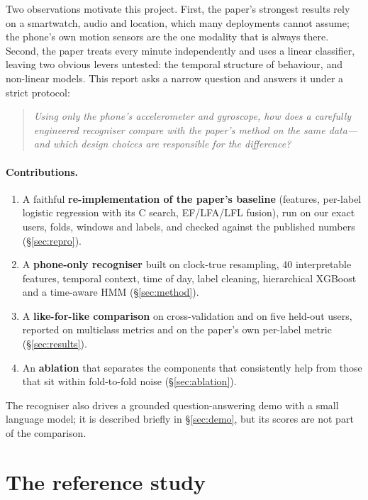 \documentclass[11pt,a4paper]{article}
\begin{document}
Two observations motivate this project. First, the paper's strongest results rely on a
smartwatch, audio and location, which many deployments cannot assume; the phone's own
motion sensors are the one modality that is always there. Second, the paper treats every
minute independently and uses a linear classifier, leaving two obvious levers untested:
the temporal structure of behaviour, and non-linear models. This report asks a narrow
question and answers it under a strict protocol:

\begin{quote}
\emph{Using only the phone's accelerometer and gyroscope, how does a carefully engineered
recogniser compare with the paper's method on the same data---and which design choices
are responsible for the difference?}
\end{quote}

\paragraph{Contributions.}
\begin{enumerate}
\item A faithful \textbf{re-implementation of the paper's baseline} (features, per-label
logistic regression with its C search, EF/LFA/LFL fusion), run on our exact users, folds,
windows and labels, and checked against the published numbers (\S\ref{sec:repro}).
\item A \textbf{phone-only recogniser} built on clock-true resampling, 40 interpretable
features, temporal context, time of day, label cleaning, hierarchical XGBoost and a
time-aware HMM (\S\ref{sec:method}).
\item A \textbf{like-for-like comparison} on cross-validation and on five held-out users,
reported on multiclass metrics and on the paper's own per-label metric
(\S\ref{sec:results}).
\item An \textbf{ablation} that separates the components that consistently help from
those that sit within fold-to-fold noise (\S\ref{sec:ablation}).
\end{enumerate}

The recogniser also drives a grounded question-answering demo with a small language
model; it is described briefly in \S\ref{sec:demo}, but its scores are not part of the
comparison.

\section{The reference study}
\label{sec:paper}
\end{document}
